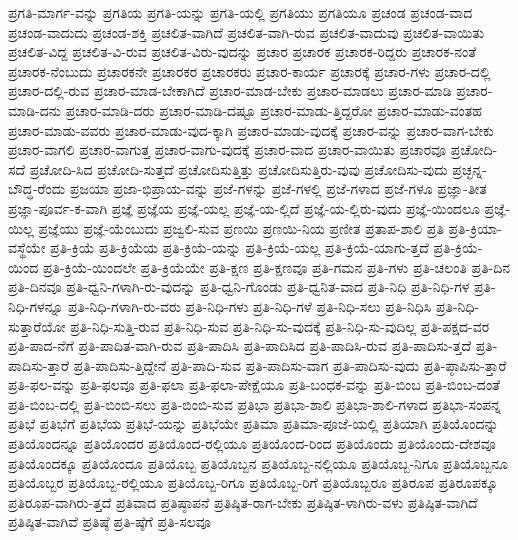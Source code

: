{ಪ್ರಗತಿ-ಮಾರ್ಗ-ವನ್ನು
ಪ್ರಗತಿಯ
ಪ್ರಗತಿ-ಯನ್ನು
ಪ್ರಗತಿ-ಯಲ್ಲಿ
ಪ್ರಗತಿಯು
ಪ್ರಗತಿಯೂ
ಪ್ರಚಂಡ
ಪ್ರಚಂಡ-ವಾದ
ಪ್ರಚಂಡ-ವಾದುದು
ಪ್ರಚಂಡ-ಶಕ್ತಿ
ಪ್ರಚಲಿತ-ವಾಗಿದೆ
ಪ್ರಚಲಿತ-ವಾಗಿ-ರುವ
ಪ್ರಚಲಿತ-ವಾದುವು
ಪ್ರಚಲಿತ-ವಾಯಿತು
ಪ್ರಚಲಿತ-ವಿದ್ದ
ಪ್ರಚಲಿತ-ವಿ-ರುವ
ಪ್ರಚಲಿತ-ವಿರು-ವುದನ್ನು
ಪ್ರಚಾರ
ಪ್ರಚಾರಕ
ಪ್ರಚಾರಕ-ರಿದ್ದರು
ಪ್ರಚಾರಕ-ನಂತೆ
ಪ್ರಚಾರಕ-ನೆಂಬುದು
ಪ್ರಚಾರಕನೇ
ಪ್ರಚಾರಕರ
ಪ್ರಚಾರಕರು
ಪ್ರಚಾರ-ಕಾರ್ಯ
ಪ್ರಚಾರಕ್ಕೆ
ಪ್ರಚಾರ-ಗಳು
ಪ್ರಚಾರ-ದಲ್ಲಿ
ಪ್ರಚಾರ-ದಲ್ಲಿ-ರುವ
ಪ್ರಚಾರ-ಮಾಡ-ಬೇಕಾಗಿದೆ
ಪ್ರಚಾರ-ಮಾಡ-ಬೇಕು
ಪ್ರಚಾರ-ಮಾಡಲು
ಪ್ರಚಾರ-ಮಾಡಿ
ಪ್ರಚಾರ-ಮಾಡಿ-ದನು
ಪ್ರಚಾರ-ಮಾಡಿ-ದರು
ಪ್ರಚಾರ-ಮಾಡಿ-ದಷ್ಟೂ
ಪ್ರಚಾರ-ಮಾಡು-ತ್ತಿದ್ದರೋ
ಪ್ರಚಾರ-ಮಾಡು-ವಂತಹ
ಪ್ರಚಾರ-ಮಾಡು-ವವರು
ಪ್ರಚಾರ-ಮಾಡು-ವುದ-ಕ್ಕಾಗಿ
ಪ್ರಚಾರ-ಮಾಡು-ವುದಕ್ಕೆ
ಪ್ರಚಾರ-ವನ್ನು
ಪ್ರಚಾರ-ವಾಗ-ಬೇಕು
ಪ್ರಚಾರ-ವಾಗಲಿ
ಪ್ರಚಾರ-ವಾಗುತ್ತ
ಪ್ರಚಾರ-ವಾಗು-ವುದಕ್ಕೆ
ಪ್ರಚಾರ-ವಾದ
ಪ್ರಚಾರ-ವಾಯಿತು
ಪ್ರಚಾರವೂ
ಪ್ರಚೋದಿ-ಸದೆ
ಪ್ರಚೋದಿ-ಸಿದ
ಪ್ರಚೋದಿ-ಸುತ್ತದೆ
ಪ್ರಚೋದಿಸುತ್ತಿತ್ತು
ಪ್ರಚೋದಿಸುತ್ತಿರು-ವುವು
ಪ್ರಚೋದಿಸು-ವುದು
ಪ್ರಚ್ಛನ್ನ-ಬೌದ್ಧ-ರೆಂದು
ಪ್ರಜಯಾ
ಪ್ರಜಾ-ಭಿಪ್ರಾಯ-ವನ್ನು
ಪ್ರಜೆ-ಗಳನ್ನು
ಪ್ರಜೆ-ಗಳಲ್ಲಿ
ಪ್ರಜೆ-ಗಳಾದ
ಪ್ರಜೆ-ಗಳೂ
ಪ್ರಜ್ಞಾ-ತೀತ
ಪ್ರಜ್ಞಾ-ಪೂರ್ವ-ಕ-ವಾಗಿ
ಪ್ರಜ್ಞೆ
ಪ್ರಜ್ಞೆಯ
ಪ್ರಜ್ಞೆ-ಯಲ್ಲ
ಪ್ರಜ್ಞೆ-ಯ-ಲ್ಲಿದೆ
ಪ್ರಜ್ಞೆ-ಯ-ಲ್ಲಿರು-ವುದು
ಪ್ರಜ್ಞೆ-ಯಿಂದಲೂ
ಪ್ರಜ್ಞೆ-ಯಿಲ್ಲ
ಪ್ರಜ್ಞೆಯು
ಪ್ರಜ್ಞೆ-ಯೆಂಬುದು
ಪ್ರಜ್ವಲಿ-ಸುವ
ಪ್ರಣಯಿ
ಪ್ರಣಯಿ-ನಿಯ
ಪ್ರಣೀತ
ಪ್ರತಾಪ-ಶಾಲಿ
ಪ್ರತಿ
ಪ್ರತಿ-ಕ್ರಿಯಾ-ವಸ್ಥೆಯೇ
ಪ್ರತಿ-ಕ್ರಿಯೆ
ಪ್ರತಿ-ಕ್ರಿಯೆಯ
ಪ್ರತಿ-ಕ್ರಿಯೆ-ಯನ್ನು
ಪ್ರತಿ-ಕ್ರಿಯೆ-ಯಲ್ಲ
ಪ್ರತಿ-ಕ್ರಿಯೆ-ಯಾಗು-ತ್ತದೆ
ಪ್ರತಿ-ಕ್ರಿಯೆ-ಯಿಂದ
ಪ್ರತಿ-ಕ್ರಿಯೆ-ಯಿಂದಲೇ
ಪ್ರತಿ-ಕ್ರಿಯೆಯೇ
ಪ್ರತಿ-ಕ್ಷಣ
ಪ್ರತಿ-ಕ್ಷಣವೂ
ಪ್ರತಿ-ಗಮನ
ಪ್ರತಿ-ಗಳು
ಪ್ರತಿ-ಚಲಂತಿ
ಪ್ರತಿ-ದಿನ
ಪ್ರತಿ-ದಿನವೂ
ಪ್ರತಿ-ಧ್ವನಿ-ಗಳಾಗಿ-ರು-ವುದನ್ನು
ಪ್ರತಿ-ಧ್ವನಿ-ಗೊಂಡು
ಪ್ರತಿ-ಧ್ವನಿತ-ವಾದ
ಪ್ರತಿ-ನಿಧಿ
ಪ್ರತಿ-ನಿಧಿ-ಗಳ
ಪ್ರತಿ-ನಿಧಿ-ಗಳನ್ನೂ
ಪ್ರತಿ-ನಿಧಿ-ಗಳಾಗಿ-ರು-ವರು
ಪ್ರತಿ-ನಿಧಿ-ಗಳು
ಪ್ರತಿ-ನಿಧಿ-ಗಳೆ
ಪ್ರತಿ-ನಿಧಿ-ಸಲು
ಪ್ರತಿ-ನಿಧಿಸಿ
ಪ್ರತಿ-ನಿಧಿ-ಸುತ್ತಾರೆಯೋ
ಪ್ರತಿ-ನಿಧಿ-ಸುತ್ತಿ-ರುವ
ಪ್ರತಿ-ನಿಧಿ-ಸುವ
ಪ್ರತಿ-ನಿಧಿ-ಸು-ವುದಕ್ಕೆ
ಪ್ರತಿ-ನಿಧಿ-ಸು-ವುದಿಲ್ಲ
ಪ್ರತಿ-ಪಕ್ಷದ-ವರ
ಪ್ರತಿ-ಪಾದ-ನೆಗೆ
ಪ್ರತಿ-ಪಾದಿತ-ವಾಗಿ-ರುವ
ಪ್ರತಿ-ಪಾದಿಸಿ
ಪ್ರತಿ-ಪಾದಿಸಿದ
ಪ್ರತಿ-ಪಾದಿಸಿ-ರುವ
ಪ್ರತಿ-ಪಾದಿಸು-ತ್ತದೆ
ಪ್ರತಿ-ಪಾದಿಸು-ತ್ತಾರೆ
ಪ್ರತಿ-ಪಾದಿಸು-ತ್ತಿದ್ದೇನೆ
ಪ್ರತಿ-ಪಾದಿ-ಸುವ
ಪ್ರತಿ-ಪಾದಿಸು-ವಾಗ
ಪ್ರತಿ-ಪಾದಿಸು-ವುದು
ಪ್ರತಿ-ಪ್ಠಾಪಿಸು-ತ್ತಾರೆ
ಪ್ರತಿ-ಫಲ-ವನ್ನು
ಪ್ರತಿ-ಫಲವೂ
ಪ್ರತಿ-ಫಲಾ
ಪ್ರತಿ-ಫಲಾ-ಪೇಕ್ಷೆಯೂ
ಪ್ರತಿ-ಬಂಧಕ-ವನ್ನು
ಪ್ರತಿ-ಬಿಂಬ
ಪ್ರತಿ-ಬಿಂಬ-ದಂತೆ
ಪ್ರತಿ-ಬಿಂಬ-ದಲ್ಲಿ
ಪ್ರತಿ-ಬಿಂಬಿ-ಸಲು
ಪ್ರತಿ-ಬಿಂಬಿ-ಸುವ
ಪ್ರತಿಭಾ
ಪ್ರತಿಭಾ-ಶಾಲಿ
ಪ್ರತಿಭಾ-ಶಾಲಿ-ಗಳಾದ
ಪ್ರತಿಭಾ-ಸಂಪನ್ನ
ಪ್ರತಿಭೆ
ಪ್ರತಿಭೆಗೆ
ಪ್ರತಿಭೆಯ
ಪ್ರತಿಭೆ-ಯನ್ನು
ಪ್ರತಿಭೆಯೇ
ಪ್ರತಿಮಾ
ಪ್ರತಿಮಾ-ಪೂಜೆ-ಯಲ್ಲಿ
ಪ್ರತಿಯಾಗಿ
ಪ್ರತಿಯೊಂದನ್ನು
ಪ್ರತಿಯೊಂದನ್ನೂ
ಪ್ರತಿಯೊಂದರ
ಪ್ರತಿಯೊಂದ-ರಲ್ಲಿಯೂ
ಪ್ರತಿಯೊಂದ-ರಿಂದ
ಪ್ರತಿಯೊಂದು
ಪ್ರತಿಯೊಂದು-ದೇಶವೂ
ಪ್ರತಿಯೊಂದಕ್ಕೂ
ಪ್ರತಿಯೊಂದೂ
ಪ್ರತಿಯೊಬ್ಬ
ಪ್ರತಿಯೊಬ್ಬನ
ಪ್ರತಿಯೊಬ್ಬ-ನಲ್ಲಿಯೂ
ಪ್ರತಿಯೊಬ್ಬ-ನಿಗೂ
ಪ್ರತಿಯೊಬ್ಬನೂ
ಪ್ರತಿಯೊಬ್ಬರ
ಪ್ರತಿಯೊಬ್ಬ-ರಲ್ಲಿಯೂ
ಪ್ರತಿಯೊಬ್ಬ-ರಿಗೂ
ಪ್ರತಿಯೊಬ್ಬ-ರಿಗೆ
ಪ್ರತಿಯೊಬ್ಬರೂ
ಪ್ರತಿರೂಪ
ಪ್ರತಿರೂಪಕ್ಕೂ
ಪ್ರತಿರೂಪ-ವಾಗಿರು-ತ್ತದೆ
ಪ್ರತಿವಾದ
ಪ್ರತಿಷ್ಠಾಪನೆ
ಪ್ರತಿಷ್ಠಿತ-ರಾಗ-ಬೇಕು
ಪ್ರತಿಷ್ಠಿತ-ಳಾಗಿರು-ವಳು
ಪ್ರತಿಷ್ಠಿತ-ವಾಗಿದೆ
ಪ್ರತಿಷ್ಠಿತ-ವಾಗಿವೆ
ಪ್ರತಿಷ್ಠೆ
ಪ್ರತಿ-ಷ್ಠೆಗೆ
ಪ್ರತಿ-ಸಲವೂ
}
